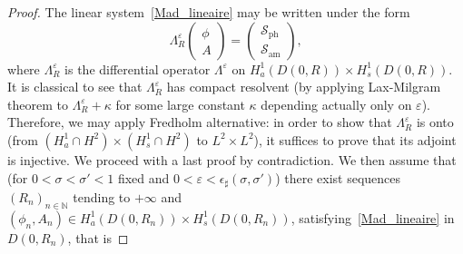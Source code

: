 \documentclass[10pt]{amsart}
\theoremstyle{definition}\newtheorem{defi}[theo]{Definition}\newtheorem{rema}[theo]{Remark}\newtheorem{exam}[theo]{Example}\newtheorem{exem}[theo]{Example}\newtheorem{nota}[theo]{Notation}
\newcommand*\N{\mathbb N}
\newcommand{\amm}{\mathrm{am}}
\newcommand{\phl}{\mathrm{ph}}
\newcommand*\BS{\mathcal{S}}
\newcommand*\ii{\infty}
\newcommand*\e{\varepsilon}
\newcommand*\ep{\epsilon}
\newcommand*\s{\sigma}
\begin{document}
\begin{proof}
The linear system~\eqref{Mad_lineaire} may be written under the form
\begin{equation*}
\Lambda^\e_R
\begin{pmatrix}
\phi \\ A
\end{pmatrix} =
\begin{pmatrix} \BS_{\phl} \\ \BS_{\amm}
\end{pmatrix},
\end{equation*}
where $ \Lambda^\e_R $ is the differential operator $ \Lambda^\e $ on $ H^{1}_a (D(0,R)) \times H^{1}_s (D(0,R)) $. It is classical to see that $ \Lambda^\e_R $ has compact resolvent (by applying Lax-Milgram theorem to $ \Lambda_R^\e + \kappa $ for some large constant $ \kappa $ depending actually only on $ \e $). Therefore, we may apply Fredholm alternative: in order to show that $ \Lambda^\e_R $ is onto (from $ (H^1_a \cap H^2) \times (H^1_s \cap H^2) $ to $ L^2 \times L^2 $), it suffices to prove that its adjoint is injective. We proceed with a last proof by contradiction. We then assume that (for $ 0 < \s < \s' <1 $ fixed and $ 0 < \e < \ep_\sharp (\s, \s') $) there exist sequences $ (R_n)_{n \in \N} $ tending to $ + \ii $ and $ (\phi_n, A_n) \in H^1_{a } (D(0,R_n)) \times H^1_{ s } (D(0,R_n))$, satisfying~\eqref{Mad_lineaire} in $ D(0,R_n)$, that is


\end{proof}
\end{document}
